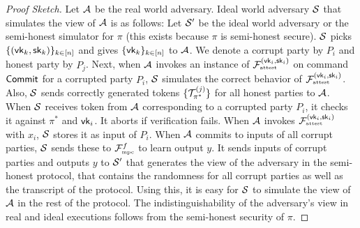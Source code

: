 \newcommand{\simush}{\simu'}

\noindent\begin{proof}[Proof Sketch]  Let $\mathcal{A}$ be the real world adversary. 
Ideal world adversary $\mathcal{S}$ that simulates the view of $\mathcal{A}$ is as follows: 
Let $\simush$ be the ideal world adversary or the semi-honest simulator for $\pi$ (this exists because $\pi$ is semi-honest secure). 
$\mathcal{S}$ picks $\{(\mathsf{vk}_k,\mathsf{sk}_k)\}_{k\in[n]}$ and gives $\{\mathsf{vk}_k\}_{k \in [n]}$ to $\mathcal{A}$. 
We denote a corrupt party by $P_i$ and honest party by $P_j$.
Next, when $\mathcal{A}$ invokes an instance of $\mathcal{F}_{\textrm{\tiny{attest}}}^{(\mathsf{vk}_i, \mathsf{sk}_i)}$ on command $\mathsf{Commit}$ for a corrupted party $P_i$, $\mathcal{S}$ simulates the correct behavior of $\mathcal{F}_{\textrm{\tiny{attest}}}^{(\mathsf{vk}_i,\mathsf{sk}_i)}$. 
Also, $\mathcal{S}$ sends correctly generated tokens $\{\mathcal{T}^{(j)}_{\pi^*}\}$ for all honest parties to $\mathcal{A}$. 
When $\mathcal{S}$ receives token from $\mathcal{A}$ corresponding to a corrupted party $P_i$, it checks it against $\pi^*$ and $\mathsf{vk}_i$. It aborts if verification fails.
When $\mathcal{A}$ invokes $\mathcal{F}_{\textrm{\tiny{attest}}}^{(\mathsf{vk}_i, \mathsf{sk}_i)}$ with $x_i$, $\mathcal{S}$ stores it as input of $P_i$. When $\mathcal{A}$ commits to inputs of all corrupt parties, $\mathcal{S}$ sends these to $\mathcal{F}_{\textrm{\tiny{mpc}}}^f$ to learn output $y$. It sends inputs of corrupt parties and outputs $y$ to $\simush$ that generates the view of the adversary in the semi-honest protocol, that contains the randomness for all corrupt parties as well as the transcript of the protocol. Using this, it is easy for $\mathcal{S}$ to simulate the view of $\mathcal{A}$ in the rest of the protocol. 
The indistinguishability of the adversary's view in real and ideal executions follows from the semi-honest security of $\pi$. 
\end{proof}




